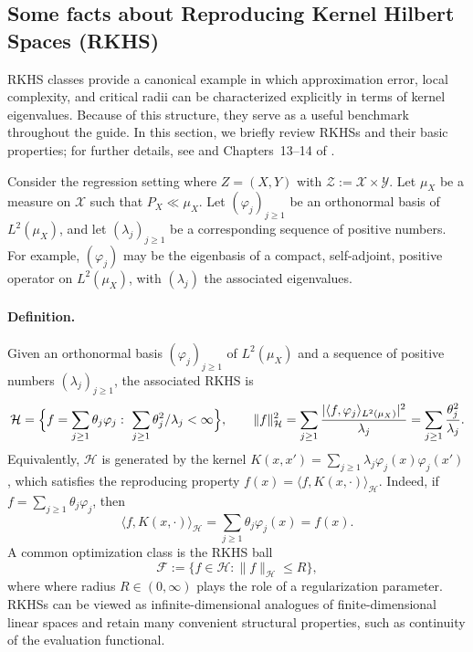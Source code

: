 \documentclass[11pt]{article}
\theoremstyle{plain}
\theoremstyle{definition} %
\begin{document}
 

\subsection{Some facts about Reproducing Kernel Hilbert Spaces (RKHS)}
\label{app::rkhs}

RKHS classes provide a canonical example in which approximation error,
local complexity, and critical radii can be characterized explicitly
in terms of kernel eigenvalues. Because of this structure, they serve
as a useful benchmark throughout the guide. In this section, we briefly
review RKHSs and their basic properties; for further details, see
\cite{mendelson2010regularization} and Chapters~13--14 of
\cite{wainwright2019high}.

Consider the regression setting where \(Z=(X,Y)\) with
\(\mathcal Z:=\mathcal X\times \mathcal Y\). Let \(\mu_X\) be a measure
on \(\mathcal X\) such that \(P_X\ll \mu_X\).
Let \((\varphi_j)_{j\ge 1}\) be an orthonormal basis of \(L^2(\mu_X)\),
and let \((\lambda_j)_{j\ge 1}\) be a corresponding sequence of positive
numbers. For example, \((\varphi_j)\) may be the eigenbasis of a compact,
self-adjoint, positive operator on \(L^2(\mu_X)\), with \((\lambda_j)\)
the associated eigenvalues.


\noindent\paragraph{Definition.}
Given an orthonormal basis \((\varphi_j)_{j\ge 1}\) of \(L^2(\mu_X)\) and a sequence
of positive numbers \((\lambda_j)_{j\ge 1}\), the associated RKHS is
\[
\mathcal H
=
\Bigl\{
f=\sum_{j\ge 1}\theta_j \varphi_j
:\ 
\sum_{j\ge 1}\theta_j^2/\lambda_j<\infty
\Bigr\},
\qquad
\|f\|_{\mathcal H}^2
=
\sum_{j\ge 1}
\frac{|\langle f,\varphi_j\rangle_{L^2(\mu_X)}|^2}{\lambda_j}
=
\sum_{j\ge 1}\frac{\theta_j^2}{\lambda_j}.
\]
Equivalently, \(\mathcal H\) is generated by the kernel
\(K(x,x')=\sum_{j\ge 1}\lambda_j \varphi_j(x)\varphi_j(x')\),
which satisfies the reproducing property
\(f(x)=\langle f, K(x,\cdot)\rangle_{\mathcal H}\).
Indeed, if \(f=\sum_{j\ge 1}\theta_j\varphi_j\), then
\[
\langle f, K(x,\cdot)\rangle_{\mathcal H}
=
\sum_{j\ge 1}\theta_j\varphi_j(x)
=
f(x).
\]
A common optimization class is the RKHS ball
\[
\mathcal F:=\{f\in\mathcal H:\|f\|_{\mathcal H}\le R\},
\]
where where radius $R \in (0,\infty)$ plays the role of a regularization parameter.
RKHSs can be viewed as infinite-dimensional analogues of finite-dimensional
linear spaces and retain many convenient structural properties,
such as continuity of the evaluation functional.  
\end{document}
